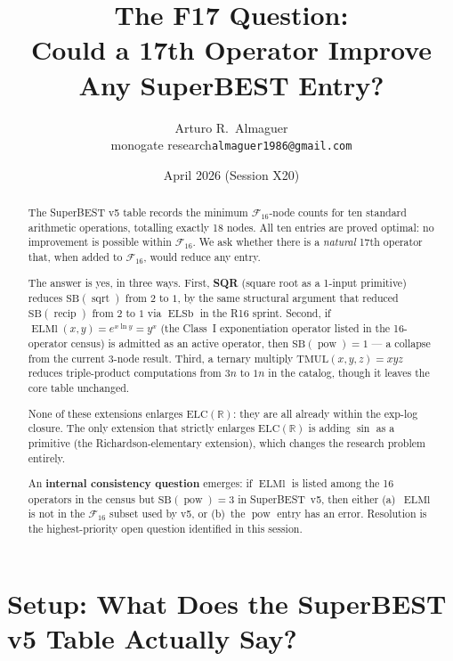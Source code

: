 \documentclass[12pt,a4paper]{article}
\title{The F17 Question:\\[4pt]
       Could a 17th Operator Improve Any SuperBEST Entry?}
\author{Arturo R.\ Almaguer\\
  \small monogate research\quad\texttt{almaguer1986@gmail.com}}
\date{April 2026 (Session X20)}
\theoremstyle{definition}
\theoremstyle{remark}
\newcommand{\ELSb}{\operatorname{ELSb}}
\newcommand{\ELMl}{\operatorname{ELMl}}
\newcommand{\recip}{\operatorname{recip}}
\newcommand{\powop}{\operatorname{pow}}
\newcommand{\sqrtop}{\operatorname{sqrt}}
\newcommand{\SB}{\mathrm{SB}}
\newcommand{\F}{\mathcal{F}_{16}}
\newcommand{\ELC}{\mathrm{ELC}(\mathbb{R})}
\begin{document}
\maketitle

\begin{abstract}
The SuperBEST v5 table records the minimum $\mathcal{F}_{16}$-node counts
for ten standard arithmetic operations, totalling exactly 18 nodes.
All ten entries are proved optimal: no improvement is possible within $\F$.
We ask whether there is a \emph{natural} 17th operator that, when added to
$\F$, would reduce any entry.

The answer is yes, in three ways.
First, \textbf{SQR} (square root as a 1-input primitive) reduces
$\SB(\sqrtop)$ from $2$ to $1$, by the same structural argument that
reduced $\SB(\recip)$ from $2$ to $1$ via $\ELSb$ in the R16 sprint.
Second, if $\ELMl(x,y) = e^{x\ln y} = y^x$ (the Class~I exponentiation
operator listed in the 16-operator census) is admitted as an active
operator, then $\SB(\powop) = 1$ --- a collapse from the current
3-node result.
Third, a ternary multiply $\mathrm{TMUL}(x,y,z)=xyz$ reduces
triple-product computations from $3n$ to $1n$ in the catalog,
though it leaves the core table unchanged.

None of these extensions enlarges $\ELC$: they are all already within the
exp-log closure.  The only extension that strictly enlarges $\ELC$ is adding
$\sin$ as a primitive (the Richardson-elementary extension), which changes the
research problem entirely.

An \textbf{internal consistency question} emerges: if $\ELMl$ is
listed among the 16 operators in the census but $\SB(\powop)=3$ in
SuperBEST~v5, then either (a)~$\ELMl$ is not in the $\F$ subset used
by v5, or (b)~the $\powop$ entry has an error.
Resolution is the highest-priority open question identified in this session.
\end{abstract}

\tableofcontents

\section{Setup: What Does the SuperBEST v5 Table Actually Say?}
\label{sec:setup}
\end{document}
